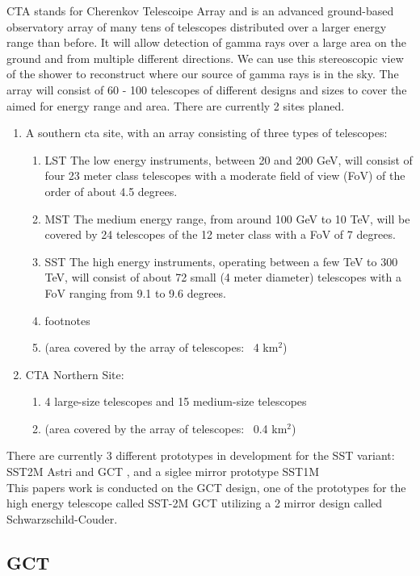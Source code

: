 \documentclass[12pt,article,type=msc,colorback,accentcolor=tud9c]{tudthesis}
\begin{document}
CTA stands for Cherenkov Telescoipe Array and is an advanced ground-based observatory array of many tens of telescopes distributed over a larger energy range than before. It will allow detection of gamma rays over a large area on the ground and from multiple different directions. We can use this stereoscopic view of the shower to reconstruct where our source of gamma rays is in the sky. The array will consist of 60 - 100 telescopes of different designs and sizes to cover the aimed for energy range and area.
There are currently 2 sites planed.     
\begin{enumerate}
\item A southern cta site, with an array consisting of three types of telescopes:\\
\begin{enumerate}
\item LST The low energy instruments, between 20 and 200 GeV, will consist of four 23 meter class telescopes with a moderate field of view (FoV) of the order of about 4.5 degrees.
\item MST The medium energy range, from around 100 GeV to 10 TeV, will be covered by 24 telescopes of the 12 meter class with a FoV of 7 degrees.
\item SST The high energy instruments, operating between a few TeV to 300 TeV, will consist of about 72 small (4 meter diameter) telescopes with a FoV ranging from 9.1 to 9.6 degrees.
\item footnotes
\item  (area covered by the array of telescopes: ~4 km$^2$)\\
\end{enumerate}
\item CTA Northern Site:
\begin{enumerate} 
\item 4 large-size telescopes and 15 medium-size telescopes
\item (area covered by the array of telescopes: ~0.4 km$^2$)
\end{enumerate}
\end{enumerate}

There are currently 3 different prototypes in development for the SST variant: SST2M Astri and GCT , and a siglee mirror prototype SST1M\\
This papers work is conducted on the GCT design, one of the prototypes for the high energy telescope called SST-2M GCT utilizing a 2 mirror design called Schwarzschild-Couder.

\subsection{GCT}
\end{document}
